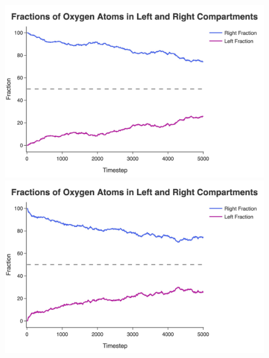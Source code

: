 \documentclass[10pt]{article}
\begin{document}
\newpage

\begin{figure}[H]
    \centering
    \begin{minipage}{0.43\linewidth}
        \includegraphics[width=\linewidth]{../figures/jpg/distribution/atoms_1000_temp_300_compartment_fractions.jpg}
    \end{minipage}
    \begin{minipage}{0.43\linewidth}
        \includegraphics[width=\linewidth]{../figures/jpg/distribution/atoms_1000_temp_1000_compartment_fractions.jpg}
    \end{minipage} \\
    \begin{minipage}{0.43\linewidth}

\end{minipage}
\end{figure}
\end{document}
